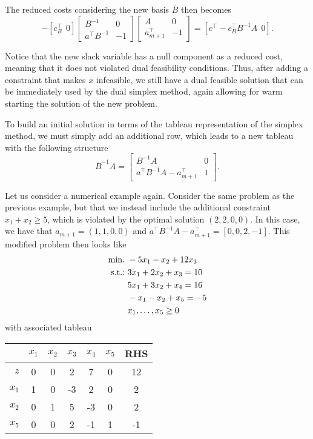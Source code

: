 The reduced costs considering the new basis $\overline{B}$ then becomes
%
\begin{equation*}
	[c^\top ~~ 0] - [c_B^\top ~~ 0]\begin{bmatrix} B^{-1} & 0 \\ a^\top B^{-1} & -1 \end{bmatrix}\begin{bmatrix} A & 0 \\ a_{m+1}^\top & -1 \end{bmatrix} = [c^\top - c^\top_B B^{-1}A ~~ 0].
\end{equation*}
  	
Notice that the new slack variable has a null component as a reduced cost, meaning that it does not violated dual feasibility conditions. Thus, after adding a constraint that makes $\overline{x}$ infeasible, we still have a dual feasible solution that can be immediately used by the dual simplex method, again allowing for warm starting the solution of the new problem.

To build an initial solution in terms of the tableau representation of the simplex method, we must simply add an additional row, which leads to a new tableau with the following structure
%
\begin{equation*}
	\overline{B}^{-1}A = \begin{bmatrix} B^{-1}A & 0 \\ a^\top B^{-1}A - a_{m+1}^\top & 1 \end{bmatrix}.
\end{equation*}
%		

Let us consider a numerical example again. Consider the same problem as the previous example, but that we instead include the additional constraint $x_1 + x_2 \geq 5$, which is violated by the optimal solution $(2,2,0,0)$. In this case, we have that $a_{m+1} = (1,1,0,0)$ and $a^\top B^{-1} A - a^\top_{m+1} = [0, 0, 2, -1]$. This modified problem then looks like
%
\begin{align*}
	\mathop{\text{min.~}} & -5x_1 -x_2 + 12 x_3 \\
	\mathop{\text{s.t.:~}}   & 3x_1 + 2x_2 + x_3  = 10 \\
	& 5x_1 + 3x_2 + x_4 = 16 \\
	& -x_1 - x_2 + x_5 = -5  \\
	& x_1, \dots, x_5 \geq 0
\end{align*}
%
with associated tableau

\begin{center}
	\begin{tabular}{r|ccccc|c} 
	   &$x_1$ & $x_2$ & $x_3$ & $x_4$ & $x_5$ & RHS \\ \hline	
	   $z$ & 0 & 0 & 2 & 7 & 0 & 12                 \\ \hline
	   $x_1$ & 1 & 0 & -3 & 2 & 0 & 2 				\\
	   $x_2$ & 0 & 1 & 5 & -3 & 0 & 2 				\\
	   $x_5$ &  0 &  0 &  2 & -1 & 1 & -1           
	\end{tabular}
\end{center}

